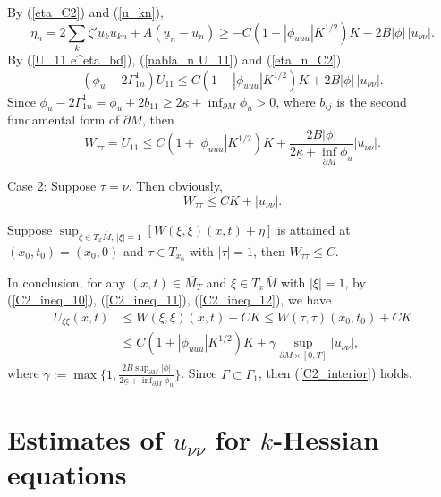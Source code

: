 \documentclass[12pt]{amsart}
\theoremstyle{definition}
\theoremstyle{remark}
\numberwithin{equation}{section}
\begin{document}
By (\ref{eta_C2}) and (\ref{u_kn}), 
\begin{equation}\label{eta_n_C2}
\eta_n = 2 \sum_{k}\zeta' u_k u_{kn} + A (\underline{u}_n - u_n) \geq - C (1 + |\phi_{uuu}| K^{1/2})K - 2B |\phi|\, |u_{\nu\nu}|.
\end{equation}
By (\ref{U_11 e^eta_bd}), (\ref{nabla_n U_11}) and (\ref{eta_n_C2}),
\begin{equation}
(\phi_u - 2\Gamma_{1n}^1)  U_{11} \leq C (1 + |\phi_{uuu}| K^{1/2}) K + 2B |\phi|\,|u_{\nu\nu}|.
\end{equation}
Since $\phi_u -2 \Gamma_{1n}^1 = \phi_u + 2 b_{11} \geq 2\underline{\kappa} + \inf_{\partial M} \phi_u > 0$, where $b_{ij}$ is the second fundamental form of $\partial M$, then
\begin{equation}\label{C2_ineq_11}
W_{\tau\tau} = U_{11} \leq C(1 + |\phi_{uuu}| K^{1/2}) K + \frac{2B|\phi|}{2\underline{\kappa} + \inf_{\partial M} \phi_u}|u_{\nu\nu}|.
\end{equation}

Case 2: Suppose $\tau = \nu$. Then obviously,
\begin{equation}\label{C2_ineq_12}
W_{\tau\tau} \leq CK + |u_{\nu\nu}|.
\end{equation}

Suppose $\sup_{\xi \in T_x \overline{M},\, |\xi|=1} \left[W(\xi , \xi)(x, t) + \eta\right] $ is attained at $(x_0, t_0) = (x_0, 0)$ and $\tau \in T_{x_0}$ with $|\tau| = 1$, then $W_{\tau\tau} \leq C$.

In conclusion, for any $(x, t) \in \overline{M_T}$ and $\xi \in T_x \overline{M}$ with $|\xi| = 1$, by (\ref{C2_ineq_10}), (\ref{C2_ineq_11}), (\ref{C2_ineq_12}), we have
\begin{equation}\label{C2_ineq_13}
\begin{aligned}
U_{\xi\xi}(x, t) &\leq W(\xi, \xi)(x, t) + CK \leq W(\tau, \tau)(x_0, t_0) + CK \\
&\leq C(1 + |\phi_{uuu}| K^{1/2})K + \gamma \sup_{\partial M \times [0, T]} |u_{\nu\nu}|,
\end{aligned}
\end{equation}
where $\gamma := \max \{ 1,\frac{2B \sup_{\partial M} |\phi|}{2\underline{\kappa} + \inf_{\partial M} \phi_u}  \}$.
Since $\Gamma \subset \Gamma_1$, then (\ref{C2_interior}) holds.


\section{Estimates of $u_{\nu\nu}$ for $k$-Hessian equations}\label{estimates.sec_3}
\end{document}
